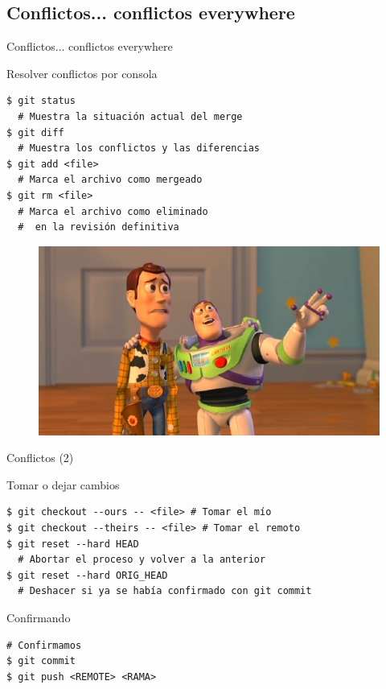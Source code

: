 \documentclass{beamer}
\begin{document}
\subsection{Conflictos... conflictos everywhere}

\begin{frame}[fragile]{Conflictos... conflictos everywhere}

  \begin{block}{Resolver conflictos por consola}
    \begin{verbatim}
$ git status                       
  # Muestra la situación actual del merge
$ git diff                         
  # Muestra los conflictos y las diferencias
$ git add <file>                   
  # Marca el archivo como mergeado
$ git rm <file>                    
  # Marca el archivo como eliminado 
  #  en la revisión definitiva
    \end{verbatim}

  \end{block}
  \begin{figure}
    \includegraphics[scale=0.15]{everywhere.jpg} 
  \end{figure}
\end{frame}

\begin{frame}[fragile]{Conflictos (2)}

  \begin{block}{Tomar o dejar cambios}
    \begin{verbatim}
$ git checkout --ours -- <file> # Tomar el mío
$ git checkout --theirs -- <file> # Tomar el remoto
$ git reset --hard HEAD            
  # Abortar el proceso y volver a la anterior
$ git reset --hard ORIG_HEAD       
  # Deshacer si ya se había confirmado con git commit
    \end{verbatim}

  \end{block} \pause
  
  \begin{block}{Confirmando}
   \begin{verbatim}
# Confirmamos
$ git commit
$ git push <REMOTE> <RAMA>
   \end{verbatim}
  \end{block}

\end{frame}
\end{document}
